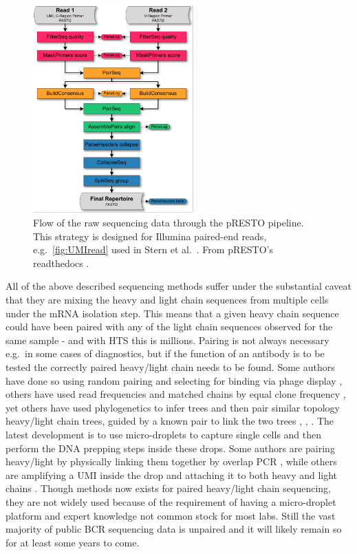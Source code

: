 \begin{figure}[ht]
    \centering
    \includegraphics[width=0.55\textwidth]{figures/Stern2014_Flowchart.pdf}
    \caption{
        \label{fig:UMIread_flow}
        Flow of the raw sequencing data through the pRESTO pipeline. This strategy is designed for Illumina paired-end reads, e.g.\ \ref{fig:UMIread} used in Stern et al.\ \cite{stern2014b}. From pRESTO's readthedocs \cite{vander2014presto}.
    }
\end{figure}


All of the above described sequencing methods suffer under the substantial caveat that they are mixing the heavy and light chain sequences from multiple cells under the mRNA isolation step.
This means that a given heavy chain sequence could have been paired with any of the light chain sequences observed for the same sample - and with HTS this is millions.
Pairing is not always necessary e.g.\ in some cases of diagnostics, but if the function of an antibody is to be tested the correctly paired heavy/light chain needs to be found.
Some authors have done so using random pairing and selecting for binding via phage display \cite{glanville2009precise}, others have used read frequencies and matched chains by equal clone frequency \cite{reddy2010monoclonal}, yet others have used phylogenetics to infer trees and then pair similar topology heavy/light chain trees, guided by a known pair to link the two trees \cite{Zhu_undated-zz}, \cite{kwong2017antibodyomics}, \cite{huang2016identification}.
The latest development is to use micro-droplets to capture single cells and then perform the DNA prepping steps inside these drops.
Some authors are pairing heavy/light by physically linking them together by overlap PCR \cite{mcdaniel2016ultra}, while others are amplifying a UMI inside the drop and attaching it to both heavy and light chains \cite{Briggs134841}.
Though methods now exists for paired heavy/light chain sequencing, they are not widely used because of the requirement of having a micro-droplet platform and expert knowledge not common stock for most labs.
Still the vast majority of public BCR sequencing data is unpaired and it will likely remain so for at least some years to come.



